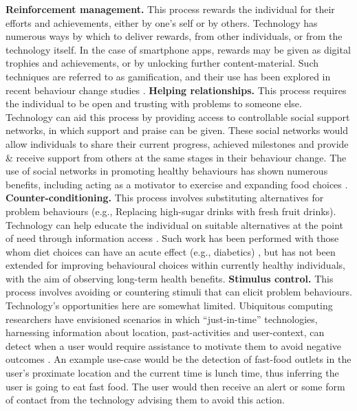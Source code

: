\textbf{Reinforcement management.} This process rewards the individual for their efforts and achievements, either by one's self or by others. Technology has numerous ways by which to deliver rewards, from other individuals, or from the technology itself. In the case of smartphone apps, rewards may be given as digital trophies and achievements, or by unlocking further content-material. Such techniques are referred to as gamification, and their use has been explored in recent behaviour change studies \cite{Schoech2013}.
\newline \textbf{Helping relationships.} This process requires the individual to be open and trusting with problems to someone else. Technology can aid this process by providing access to controllable social support networks, in which support and praise can be given. These social networks would allow individuals to share their current progress, achieved milestones and provide \& receive support from others at the same stages in their behaviour change. The use of social networks in promoting healthy behaviours has shown numerous benefits, including acting as a motivator to exercise and expanding food choices \cite{Vaterlaus2015, Kamal2014}.
\newline \textbf{Counter-conditioning.} This process involves substituting alternatives for problem behaviours (e.g., Replacing high-sugar drinks with fresh fruit drinks). Technology can help educate the individual on suitable alternatives at the point of need through information access \cite{Kamal2014, Hermawati2014, Dunford2014}. Such work has been performed with those whom diet choices can have an acute effect (e.g., diabetics) \cite{Klonoff2013}, but has not been extended for improving behavioural choices within currently healthy individuals, with the aim of observing long-term health benefits.
\newline \textbf{Stimulus control.} This process involves avoiding or countering stimuli that can elicit problem behaviours. Technology's opportunities here are somewhat limited. Ubiquitous computing researchers have envisioned scenarios in which ``just-in-time'' technologies, harnessing information about location, past-activities and user-context, can detect when a user would require assistance to motivate them to avoid negative outcomes \cite{Intille2004}. An example use-case would be the detection of fast-food outlets in the user's proximate location and the current time is lunch time, thus inferring the user is going to eat fast food. The user would then receive an alert or some form of contact from the technology advising them to avoid this action.

